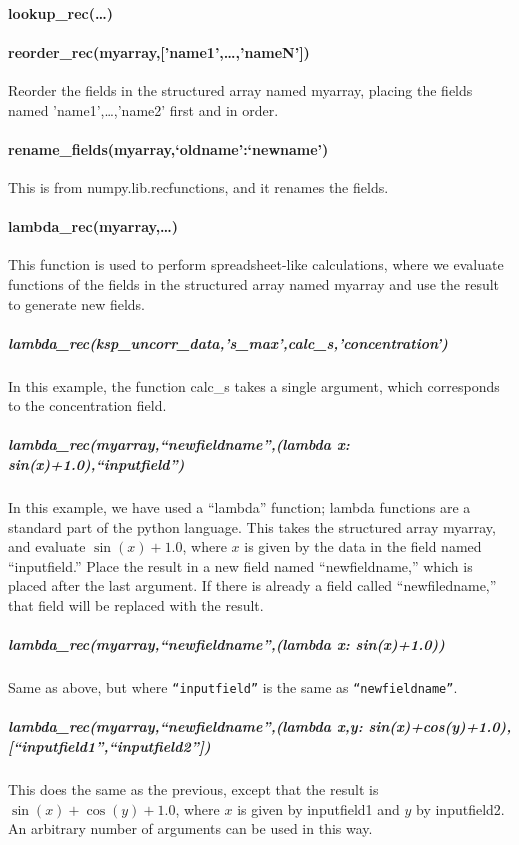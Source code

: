 \paragraph{lookup\_rec(\ldots)}
\paragraph{reorder\_rec(myarray,['name1',\ldots,'nameN'])}
Reorder the fields in the structured array named myarray,
    placing the fields named 'name1',\ldots,'name2'
    first and in order.
\paragraph{rename\_fields(myarray,{`oldname':`newname'})}
This is from numpy.lib.recfunctions, and it renames the fields.
\paragraph{lambda\_rec(myarray,\ldots)}\label{codelabel:lambda_rec}
This function is used to perform spreadsheet-like calculations,
    where we evaluate functions of the fields in the structured
    array named myarray and use the result to generate new fields.

\subparagraph{lambda_rec(ksp_uncorr_data,'s_{max}',calc\_s,'concentration')}
In this example, the function calc\_s takes a single argument, which corresponds to the concentration field.
\subparagraph{lambda\_rec(myarray,``newfieldname'',(lambda x: sin(x)+1.0),``inputfield'')}
In this example, we have used a ``lambda'' function;
    lambda functions are a standard part of the python language.
This takes the structured array myarray,
    and evaluate $\sin(x)+1.0$, where $x$ is given
    by the data in the field named ``inputfield.''
Place the result in a new field named ``newfieldname,''
    which is placed after the last argument.
If there is already a field called ``newfiledname,''
    that field will be replaced with the result.

\subparagraph{lambda\_rec(myarray,``newfieldname'',(lambda x: sin(x)+1.0))}
Same as above, but where \texttt{``inputfield''} is the same as \texttt{``newfieldname''}.
\subparagraph{lambda\_rec(myarray,``newfieldname'',(lambda x,y: sin(x)+cos(y)+1.0),[``inputfield1'',``inputfield2''])}
This does the same as the previous, except that
    the result is $\sin(x)+\cos(y)+1.0$, where
    $x$ is given by inputfield1 and $y$ by inputfield2.
An arbitrary number of arguments can be used in this way.
